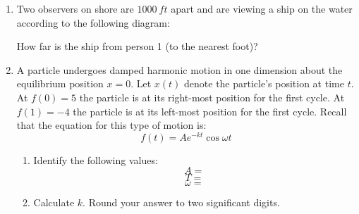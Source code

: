 \documentclass[letterpaper,12pt,fleqn]{article}
\newcommand{\w}{\omega}
\begin{document}
\begin{enumerate}
\item Two observers on shore are $\SI{1000}{ft}$ apart and are viewing a
  ship on the water according to the following diagram:

  \vspace{0.25in}

  \begin{center}
  \end{center}

  How far is the ship from person 1 (to the nearest foot)?

  \newpage

\item A particle undergoes damped harmonic motion in one dimension about the
  equilibrium position $x=0$. Let $x(t)$ denote the particle's position at
  time $t$. At $f(0)=5$ the particle is at its right-most position for the
  first cycle. At $f(1)=-4$ the particle is at its left-most position for the
  first cycle. Recall that the equation for this type of motion is:
  \[f(t)=Ae^{-kt}\cos\w t\]
  \begin{enumerate}
  \item Identify the following values:
    \[A=\]
    \[T=\]
    \[\w=\]
  \item Calculate $k$. Round your answer to two significant digits.
  \end{enumerate}

\end{enumerate}
\end{document}
